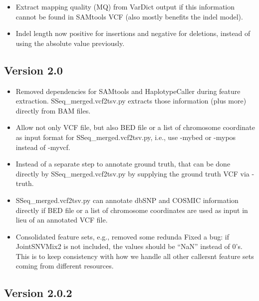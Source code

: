 \documentclass[10pt,letterpaper]{article}
\begin{document}
\begin{sloppypar}
\begin{itemize}
  \item
  Extract mapping quality (MQ) from VarDict output if this information cannot be found in SAMtools VCF (also mostly benefits the indel model). 
 
  \item
  Indel length now positive for insertions and negative for deletions, instead of using the absolute value previously. 
 
 
\end{itemize}




\subsection{Version 2.0}

\begin{itemize}
  \item
  Removed dependencies for SAMtools and HaplotypeCaller during feature extraction. SSeq\_merged.vcf2tsv.py extracts those information (plus more) directly from BAM files.

  \item
  Allow not only VCF file, but also BED file or a list of chromosome coordinate as input format for SSeq\_merged.vcf2tsv.py, i.e., use -mybed or -mypos instead of -myvcf. 

  \item
  Instead of a separate step to annotate ground truth, that can be done directly by SSeq\_merged.vcf2tsv.py by supplying the ground truth VCF via -truth.

  \item
  SSeq\_merged.vcf2tsv.py can annotate dbSNP and COSMIC information directly if BED file or a list of chromosome coordinates are used as input in lieu of an annotated VCF file. 

  \item
  Consolidated feature sets, e.g., removed some redunda
  Fixed a bug: if JointSNVMix2 is not included, the values should be ``NaN'' instead of 0's. This is to keep consistency with how we handle all other callersnt feature sets coming from different resources.
\end{itemize}


\subsection{Version 2.0.2}

\begin{itemize}


\end{itemize}
\end{sloppypar}
\end{document}
